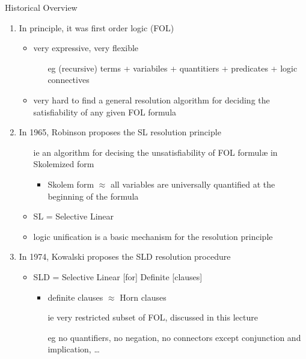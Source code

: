 \documentclass[presentation]{beamer}\mode<presentation>{\usetheme{AMSBolognaFC}}
\begin{document}
\begin{frame}[allowframebreaks]{Historical Overview}
    \begin{enumerate}
        \item In principle, it was first order logic (FOL)
        \begin{itemize}
            \item very expressive, very flexible
            \begin{itemize}
                \item[eg] (recursive) terms + variabiles + quantitiers + predicates + logic connectives
            \end{itemize}

            \item very hard to find a general \alert{resolution} algorithm for deciding the \alert{satisfiability} of any given FOL formula
        \end{itemize}

        \bigskip

        \item In 1965, Robinson proposes the \alert{SL resolution principle}
        \begin{itemize}
            \item[ie] an algorithm for decising the \alert{unsatisfiability} of FOL formul\ae{} in \alert{Skolemized form}
            \begin{itemize}
                \item Skolem form $\approx$ all variables are \alert{universally} quantified at the beginning of the formula
            \end{itemize}

            \item SL = Selective Linear
            \item logic \alert{unification} is a basic mechanism for the resolution principle
        \end{itemize}

        \framebreak

        \item In 1974, Kowalski proposes the SL\alert{D} resolution procedure
        \begin{itemize}
            \item SL\alert{D} = Selective Linear [for] \alert{Definite} [clauses]
            \begin{itemize}
                \item definite clauses $\approx$ Horn clauses
                \item[ie] very restricted subset of FOL, discussed in this lecture
                \item[eg] no quantifiers, no negation, no connectors except conjunction and implication, \ldots
            \end{itemize}
        \end{itemize}


\end{enumerate}
\end{frame}
\end{document}
